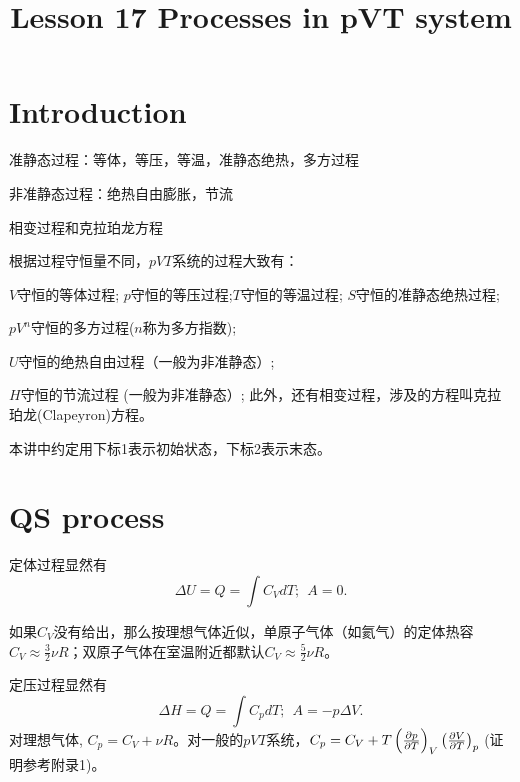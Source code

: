 \documentclass[CJK]{beamer}
\title{Lesson 17 Processes in pVT system }
\author{}
\date{}
\begin{document}


\section{Introduction}

\begin{frame}
  \bchL
  \bitem
  \item{准静态过程：等体，等压，等温，准静态绝热，多方过程}
  \item{非准静态过程：绝热自由膨胀，节流}
  \item{相变过程和克拉珀龙方程}
    \eitem
    \echL
\end{frame}


\begin{frame}
  \bch
根据过程守恒量不同，$pVT$系统的过程大致有：
  \bitem
\item{$V$守恒的{\blue 等体过程}; $p$守恒的{\blue 等压过程};$T$守恒的{\blue 等温过程}; $S$守恒的{\blue 准静态绝热过程};}
\item{$pV^n$守恒的{\blue 多方过程}($n$称为多方指数);}
\item{$U$守恒的{\blue 绝热自由过程}（一般为非准静态）;}
\item{$H$守恒的{\blue 节流过程} (一般为非准静态）;}
  \eitem
  此外，还有{\blue 相变过程}，涉及的方程叫{\blue 克拉珀龙(Clapeyron)方程}。

  \skiplines
  
  本讲中约定用{\blue 下标1表示初始状态，下标2表示末态}。
  \ech
\end{frame}

\section{QS process}


\begin{frame}
  \bchL
  定体过程显然有
  $$\Delta U = Q = \int C_V dT;\ \ A = 0.$$

  如果$C_V$没有给出，那么按理想气体近似，{\blue 单原子气体（如氦气）的定体热容 $C_V\approx \frac{3}{2}\nu R$；双原子气体在室温附近都默认$C_V\approx \frac{5}{2}\nu R$。}
  \echL
\end{frame}

\begin{frame}
  \bchL
  定压过程显然有
  $$\Delta H = Q = \int C_p dT;\ \ A=-p\Delta V.$$
  对{\blue 理想气体, $C_p = C_V + \nu R$}。对一般的$pVT$系统，$C_p = C_V + T\left(\frac{\partial p}{\partial T}\right)_{V} \left(\frac{\partial V}{\partial T}\right)_{p}$ (证明参考附录1)。
  \echL
\end{frame}
\end{document}
